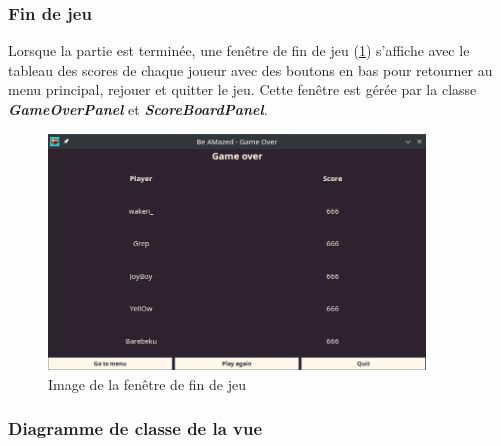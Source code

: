 \subsubsection*{Fin de jeu}

Lorsque la partie est terminée, une fenêtre de fin de jeu (\ref{fig:GameOverWindow}) s'affiche avec le tableau des scores de chaque joueur avec des boutons en bas pour retourner au menu principal, rejouer et quitter le jeu. Cette fenêtre est gérée par la classe \textbf{\textit{GameOverPanel}} et \textbf{\textit{ScoreBoardPanel}}.

\begin{figure}[!htb]%
    \centering
    \includegraphics[width=10cm]{ressources/Implementation/Labyrinthe/Vue/GameOver.png}%
    \caption{Image de la fenêtre de fin de jeu}%
    \label{fig:GameOverWindow}
\end{figure}
\FloatBarrier

\subsubsection*{Diagramme de classe de la vue}
